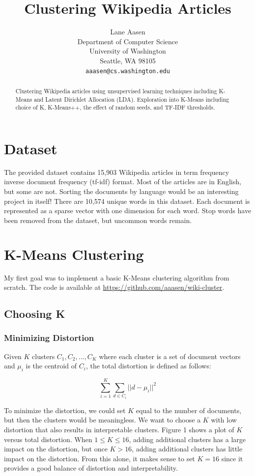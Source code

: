 \documentclass{article} %
\title{Clustering Wikipedia Articles}
\author{
Lane Aasen\\
Department of Computer Science\\
University of Washington\\
Seattle, WA 98105\\
\texttt{aaasen@cs.washington.edu}\\
}
\begin{document}
\maketitle

\begin{abstract}
Clustering Wikipedia articles using unsupervised learning techniques including K-Means and Latent Dirichlet Allocation (LDA). Exploration into K-Means including choice of K, K-Means++, the effect of random seeds, and TF-IDF thresholds.
\end{abstract}


\section{Dataset}

The provided dataset contains 15,903 Wikipedia articles in term frequency inverse document frequency (tf-idf) format. Most of the articles are in English, but some are not. Sorting the documents by language would be an interesting project in itself! There are 10,574 unique words in this dataset. Each document is represented as a sparse vector with one dimension for each word. Stop words have been removed from the dataset, but uncommon words remain.

\section{K-Means Clustering}

My first goal was to implement a basic K-Means clustering algorithm from scratch. The code is available at \url{https://github.com/aaasen/wiki-cluster}.

\subsection{Choosing K}

\subsubsection{Minimizing Distortion}

Given $K$ clusters $C_{1},C_{2},...,C_{K}$ where each cluster is a set of document vectors and $\mu_{i}$ is the centroid of $C_{i}$, the total distortion is defined as follows:

$$\sum_{i=1}^{K}\sum_{d \in C_{i}} ||d - \mu_{i}||^{2}$$

To minimize the distortion, we could set $K$ equal to the number of documents, but then the clusters would be meaningless. We want to choose a $K$ with low distortion that also results in interpretable clusters. Figure 1 shows a plot of $K$ versus total distortion. When $1 \leq K \leq 16$, adding additional clusters has a large impact on the distortion, but once $K > 16$, adding additional clusters has little impact on the distortion. From this alone, it makes sense to set $K=16$ since it provides a good balance of distortion and interpretability.
\end{document}
